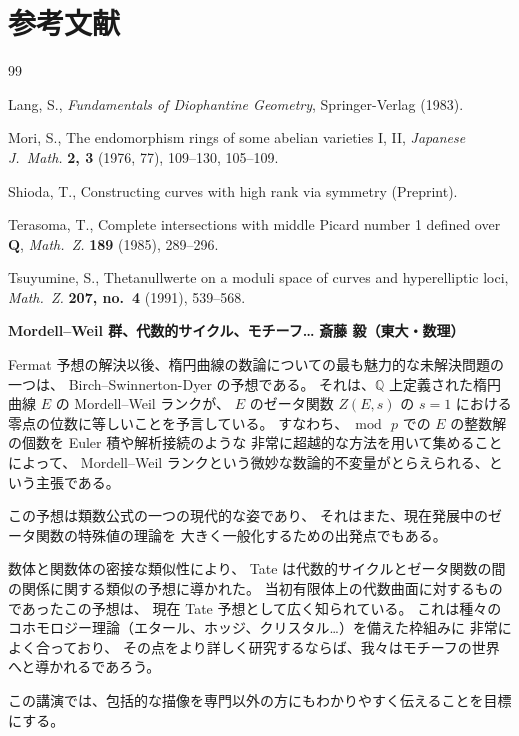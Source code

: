 \documentclass[uplatex,dvipdfmx]{jlreq}
\def\inbook#1{\textit{#1}}
\def\publ#1{#1}
\begin{document}
\section*{参考文献}

\begin{thebibliography}{99}

  Lang, S.,
  \inbook{Fundamentals of Diophantine Geometry},
  \publ{Springer-Verlag} (1983).

  Mori, S.,
  The endomorphism rings of some abelian varieties I, II,
  \textit{Japanese J.\ Math.}
  \textbf{2, 3} (1976, 77), 109--130, 105--109.

  Shioda, T.,
  Constructing curves with high rank via symmetry
  (Preprint).

  Terasoma, T.,
  Complete intersections with middle Picard number 1 defined over $\mathbf{Q}$,
  \textit{Math.\ Z.}
  \textbf{189} (1985), 289--296.

  Tsuyumine, S.,
  Thetanullwerte on a moduli space of curves and hyperelliptic loci,
  \textit{Math.\ Z.}
  \textbf{207, no.\ 4} (1991), 539--568.

\end{thebibliography}

\newpage


\noindent
{\large\bfseries Mordell--Weil 群、代数的サイクル、モチーフ{\ldots}}
\hfill
{\large\bfseries 斎藤 毅（東大・数理）}

\bigskip

Fermat 予想の解決以後、楕円曲線の数論についての最も魅力的な未解決問題の一つは、
Birch--Swinnerton-Dyer の予想である。
それは、$\mathbb{Q}$ 上定義された楕円曲線 $E$ の Mordell--Weil ランクが、
$E$ のゼータ関数 $Z(E,s)$ の $s=1$ における零点の位数に等しいことを予言している。
すなわち、$\bmod\, p$ での $E$ の整数解の個数を Euler 積や解析接続のような
非常に超越的な方法を用いて集めることによって、
Mordell--Weil ランクという微妙な数論的不変量がとらえられる、という主張である。

\medskip

この予想は類数公式の一つの現代的な姿であり、
それはまた、現在発展中のゼータ関数の特殊値の理論を
大きく一般化するための出発点でもある。

\medskip

数体と関数体の密接な類似性により、
Tate は代数的サイクルとゼータ関数の間の関係に関する類似の予想に導かれた。
当初有限体上の代数曲面に対するものであったこの予想は、
現在 Tate 予想として広く知られている。
これは種々のコホモロジー理論（エタール、ホッジ、クリスタル{\ldots}）を備えた枠組みに
非常によく合っており、
その点をより詳しく研究するならば、我々はモチーフの世界へと導かれるであろう。

\medskip

この講演では、包括的な描像を専門以外の方にもわかりやすく伝えることを目標にする。
\end{document}
